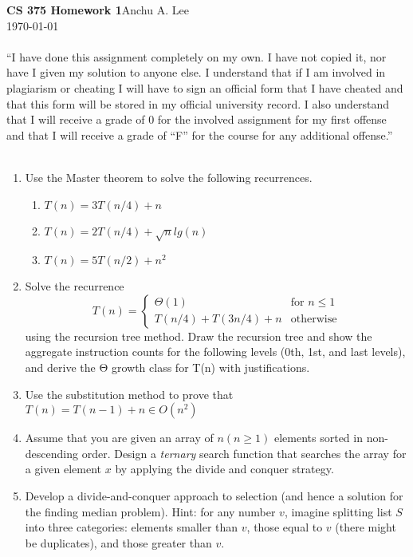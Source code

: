 \documentclass{article}
\begin{document}
    \noindent\textbf{CS 375 Homework 1}\hfill Anchu A. Lee\\
    \noindent\today
    \\\\“I have done this assignment completely on my own. I have not copied it, nor have I given my solution to anyone else. I understand that if I am involved in plagiarism or cheating I will have to sign an official form that I have cheated and that this form will be stored in my official university record. I also understand that I will receive a grade of 0 for the involved assignment for my first offense and that I will receive a grade of “F” for the course for any additional offense.” 
    \\\\
    \begin{enumerate}
        \item Use the Master theorem to solve the following recurrences.
            \begin{enumerate}
                \item $T(n)=3T(n/4)+n$
                \item $T(n)=2T(n/4)+\sqrt{n}lg(n)$
                \item $T(n)=5T(n/2)+n^2$
            \end{enumerate}
        \item Solve the recurrence 
            \[
                T(n) = 
                \begin{cases}
                    \Theta(1) & \text{for $n\leq 1$}\\
                    T(n/4)+T(3n/4)+n & \text{otherwise}
                \end{cases}
            \]
            using the recursion tree method. Draw the recursion tree and show the aggregate instruction counts for the following levels (0th, 1st, and last levels), and derive the Θ growth class for T(n) with justifications.
        \item Use the substitution method to prove that $T(n)=T(n-1)+n\in O(n^2)$
        \item Assume that you are given an array of $n(n\geq 1)$ elements sorted in non-descending order. Design a \textit{ternary} search function that searches the array for a given element $x$ by applying the divide and conquer strategy.
        \item Develop a divide-and-conquer approach to selection (and hence a solution for the finding median problem). Hint: for any number $v$, imagine splitting list $S$ into three categories: elements smaller than $v$, those equal to $v$ (there might be duplicates), and those greater than $v$. 
    \end{enumerate}
\end{document}
